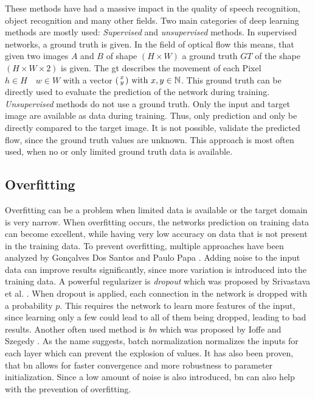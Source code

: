  These methods have had a massive impact in the quality of speech recognition, object recognition and many other fields. Two main categories of deep learning methods are mostly used: \emph{Supervised} and \emph{unsupervised} methods.
In supervised networks, a ground truth is given. In the field of optical flow this means, that given two images $A$ and $B$ of shape $\left(H\times W\right)$  a ground truth $GT$ of the shape $\left(H\times W\times 2\right)$ is given. The \acl{gt} describes the movement of each Pixel $h \in H\quad w \in W$ with a vector $\begin{psmallmatrix} x\\y \end{psmallmatrix} \text{ with } x,y \in \mathbb{N}$. This ground truth can be directly used to evaluate the prediction of the network during training.
\emph{Unsupervised} methods do not use a ground truth. Only the input and target image are available as data during training. Thus, only prediction and only be directly compared to the target image. It is not possible, validate the predicted flow, since the ground truth values are unknown. This approach is most often used, when no or only limited ground truth data is available.
\cite{lecunDeepLearning2015}
\subsection{Overfitting}
Overfitting can be a problem when limited data is available or the target domain is very narrow. When overfitting occurs, the networks prediction on training data can become excellent, while having very low accuracy on data that is not present in the training data. To prevent overfitting, multiple approaches have been analyzed by Gon\c{c}alves Dos Santos and Paulo Papa \cite{santosAvoidingOverfittingSurvey2022a}.
Adding noise to the input data can improve results significantly, since more variation is introduced into the training data.
A powerful regularizer is \emph{dropout} which was proposed by Srivastava et al. \cite{srivastavaDropoutSimpleWay}. When dropout is applied, each connection in the network is dropped with a probability $p$. This requires the network to learn more features of the input, since learning only a few could lead to all of them being dropped, leading to bad results. Another often used method is \emph{\ac{bn}} which was proposed by Ioffe and Szegedy \cite{ioffeBatchNormalizationAccelerating2015}. As the name suggests, batch normalization normalizes the inputs for each layer which can prevent the explosion of values. It has also been proven, that \ac{bn} allows for faster convergence and more robustness to parameter initialization. Since a low amount of noise is also introduced, \ac{bn} can also help with the prevention of overfitting.

